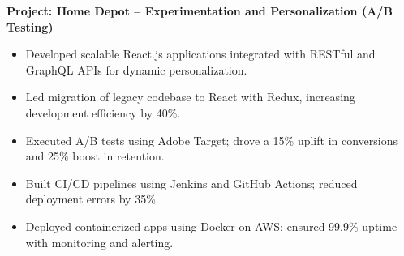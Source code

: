 \documentclass[letterpaper,10pt]{article} %
\begin{document}
\textbf{Project: Home Depot – Experimentation and Personalization (A/B Testing)}
\begin{itemize}
  \item Developed scalable React.js applications integrated with RESTful and GraphQL APIs for dynamic personalization.
  \item Led migration of legacy codebase to React with Redux, increasing development efficiency by 40\%.
  \item Executed A/B tests using Adobe Target; drove a 15\% uplift in conversions and 25\% boost in retention.
  \item Built CI/CD pipelines using Jenkins and GitHub Actions; reduced deployment errors by 35\%.
  \item Deployed containerized apps using Docker on AWS; ensured 99.9\% uptime with monitoring and alerting.
\end{itemize}
\end{document}
